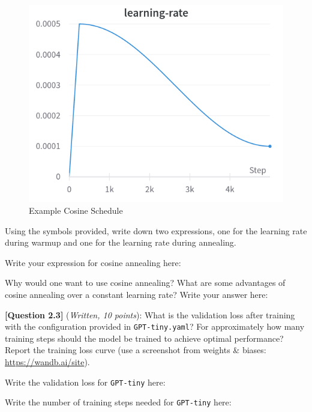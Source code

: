 \documentclass[leqno,12pt]{article}
\begin{document}
\begin{figure}[h!]
    \centering
    \includegraphics[width=0.5\linewidth]{figures/fig2-q2.2-cosine-schedule.png}
    \caption{Example Cosine Schedule}
    \label{fig:cosine-schedule}
\end{figure}

Using the symbols provided, write down two expressions, one for the learning rate during warmup and one for the learning rate during annealing.
\newline

\noindent
Write your expression for cosine annealing here:
\begin{tcolorbox}[fit,height=2cm, width=\linewidth, blank, borderline={1pt}{-2pt}]
\end{tcolorbox}

\noindent Why would one want to use cosine annealing? What are some advantages of cosine annealing over a constant learning rate? Write your answer here:
\begin{tcolorbox}[fit,height=2cm, width=\linewidth, blank, borderline={1pt}{-2pt}]
\end{tcolorbox}

\noindent \textbf{[Question 2.3]} (\emph{Written, 10 points}): What is the validation loss after training with the configuration provided in \texttt{GPT-tiny.yaml}? For approximately how many training steps should the model be trained to achieve optimal performance? Report the training loss curve (use a screenshot from weights \& biases: \url{https://wandb.ai/site}). 
\newline 

\noindent
Write the validation loss for \texttt{GPT-tiny} here:
\begin{tcolorbox}[fit,height=1cm, width=6cm, blank, borderline={1pt}{-2pt}]
\end{tcolorbox}

\noindent
Write the number of training steps needed for \texttt{GPT-tiny} here:
\begin{tcolorbox}[fit,height=1cm, width=6cm, blank, borderline={1pt}{-2pt}]
\end{tcolorbox}
\end{document}
